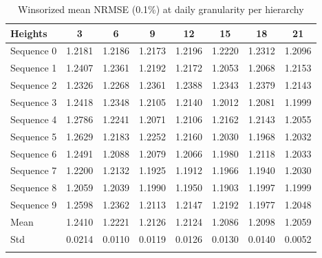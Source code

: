 \documentclass[sn-basic,Numbered,iicol]{sn-jnl}
\theoremstyle{thmstyleone}%
\theoremstyle{thmstyletwo}%
\theoremstyle{thmstylethree}%
\begin{document}
\begin{table}[h]
\caption{Winsorized mean NRMSE (0.1\%) at daily granularity per hierarchy}\label{tab:day_mean}
\begin{tabular*}{\textwidth}{@{\extracolsep\fill}lccccccc}
\toprule
Heights & 3 & 6 & 9 & 12 & 15 & 18 & 21 \\
\midrule
Sequence 0 & 1.2181 & 1.2186 & 1.2173 & 1.2196 & 1.2220 & 1.2312 & 1.2096 \\
Sequence 1 & 1.2407 & 1.2361 & 1.2192 & 1.2172 & 1.2053 & 1.2068 & 1.2153 \\
Sequence 2 & 1.2326 & 1.2268 & 1.2361 & 1.2388 & 1.2343 & 1.2379 & 1.2143 \\
Sequence 3 & 1.2418 & 1.2348 & 1.2105 & 1.2140 & 1.2012 & 1.2081 & 1.1999 \\
Sequence 4 & 1.2786 & 1.2241 & 1.2071 & 1.2106 & 1.2162 & 1.2143 & 1.2055 \\
Sequence 5 & 1.2629 & 1.2183 & 1.2252 & 1.2160 & 1.2030 & 1.1968 & 1.2032 \\
Sequence 6 & 1.2491 & 1.2088 & 1.2079 & 1.2066 & 1.1980 & 1.2118 & 1.2033 \\
Sequence 7 & 1.2200 & 1.2132 & 1.1925 & 1.1912 & 1.1966 & 1.1940 & 1.2030 \\
Sequence 8 & 1.2059 & 1.2039 & 1.1990 & 1.1950 & 1.1903 & 1.1997 & 1.1999 \\
Sequence 9 & 1.2598 & 1.2362 & 1.2113 & 1.2147 & 1.2192 & 1.1977 & 1.2048 \\
\midrule
Mean & 1.2410 & 1.2221 & 1.2126 & 1.2124 & 1.2086 & 1.2098 & 1.2059 \\
Std & 0.0214 & 0.0110 & 0.0119 & 0.0126 & 0.0130 & 0.0140 & 0.0052 \\
\botrule
\end{tabular*}
\end{table}
\end{document}
